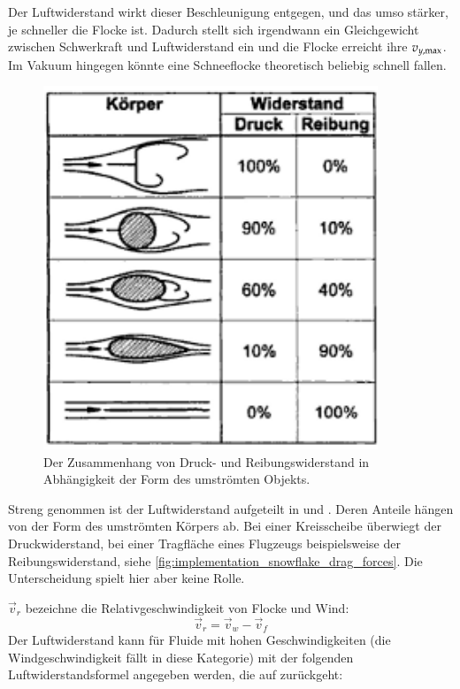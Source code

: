 Der Luftwiderstand wirkt dieser Beschleunigung entgegen, und das umso
stärker, je schneller die Flocke ist. Dadurch stellt sich irgendwann
ein Gleichgewicht zwischen Schwerkraft und Luftwiderstand ein und die
Flocke erreicht ihre 
$v_{y,\textnormal{max}}$. Im Vakuum hingegen könnte eine
Schneeflocke theoretisch beliebig schnell fallen.
\begin{figure}[ht]
    \centering
    \includegraphics[width=10cm]{images/drag_forces}
    \caption{Der Zusammenhang von Druck- und Reibungswiderstand in Abhängigkeit der Form des umströmten Objekts.}
    \label{fig:implementation_snowflake_drag_forces}
\end{figure}

Streng genommen ist der Luftwiderstand aufgeteilt in
 und
. Deren Anteile hängen von der Form
des umströmten Körpers ab. Bei einer Kreisscheibe überwiegt der
Druckwiderstand, bei einer Tragfläche eines Flugzeugs beispielsweise
der Reibungswiderstand, siehe
\autoref{fig:implementation_snowflake_drag_forces}. Die Unterscheidung
spielt hier aber keine Rolle.

$\vec{v}_r$ bezeichne die Relativgeschwindigkeit von Flocke und Wind:
\begin{equation}
\vec{v}_r = \vec{v}_w - \vec{v}_f
\end{equation}
Der Luftwiderstand kann für Fluide mit hohen Geschwindigkeiten (die
Windgeschwindigkeit fällt in diese Kategorie) mit der folgenden
Luftwiderstandsformel angegeben werden, die auf 
zurückgeht:

